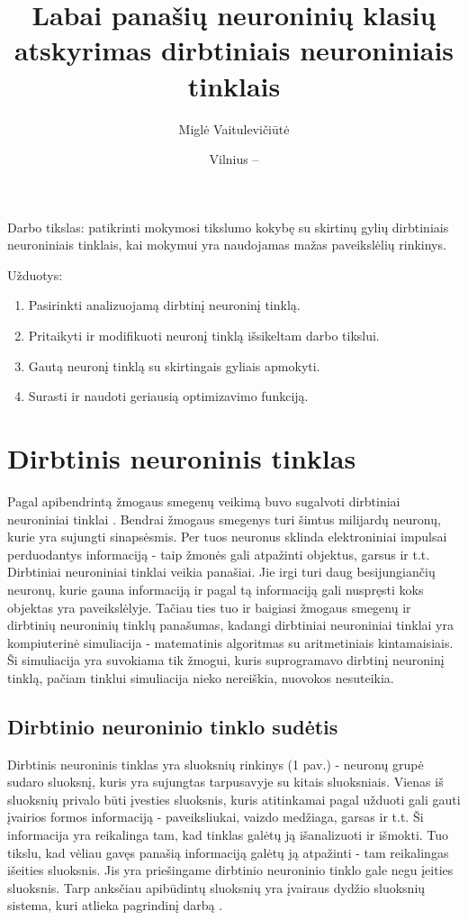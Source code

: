 \documentclass{VUMIFPSkursinis}
\title{Labai panašių neuroninių klasių atskyrimas dirbtiniais neuroniniais tinklais}
\author{Miglė Vaitulevičiūtė}
\date{Vilnius – \the\year}
\begin{document}
	
\maketitle
\cleardoublepage{}
\setcounter{page}{2}

\tableofcontents


Darbo tikslas: patikrinti mokymosi tikslumo kokybę su skirtinų gylių dirbtiniais neuroniniais tinklais, kai mokymui yra naudojamas mažas paveikslėlių rinkinys.

Užduotys:
\begin{enumerate}
\item Pasirinkti analizuojamą dirbtinį neuroninį tinklą.
\item Pritaikyti ir modifikuoti neuronį tinklą išsikeltam darbo tikslui.
\item Gautą neuronį tinklą su skirtingais gyliais apmokyti.
\item Surasti ir naudoti geriausią optimizavimo funkciją.
\end{enumerate}


\section{Dirbtinis neuroninis tinklas}
Pagal apibendrintą žmogaus smegenų veikimą buvo sugalvoti dirbtiniai neuroniniai tinklai \cite{Goodfellow-et-al-2016}. Bendrai žmogaus smegenys turi šimtus
milijardų neuronų, kurie yra sujungti sinapsėsmis. Per tuos neuronus sklinda elektroniniai impulsai perduodantys informaciją - taip žmonės gali 
atpažinti objektus, garsus ir t.t. Dirbtiniai neuroniniai tinklai veikia panašiai. Jie irgi turi daug besijungiančių neuronų, kurie gauna informaciją ir 
pagal tą informaciją gali nuspręsti koks objektas yra paveikslėlyje. Tačiau ties tuo ir baigiasi žmogaus smegenų ir dirbtinių neuroninių tinklų panašumas, 
kadangi dirbtiniai neuroniniai tinklai yra kompiuterinė simuliacija - matematinis algoritmas su aritmetiniais kintamaisiais. Ši simuliacija yra suvokiama 
tik žmogui, kuris suprogramavo dirbtinį neuroninį tinklą, pačiam tinklui simuliacija nieko nereiškia, nuovokos nesuteikia.

\subsection{Dirbtinio neuroninio tinklo sudėtis}
Dirbtinis neuroninis tinklas yra sluoksnių rinkinys (1 pav.) - neuronų grupė sudaro sluoksnį, kuris yra sujungtas tarpusavyje su kitais sluoksniais. Vienas iš
sluoksnių privalo būti įvesties sluoksnis, kuris atitinkamai pagal užduoti gali gauti įvairios formos informaciją - paveiksliukai, vaizdo
medžiaga, garsas ir t.t. Ši informacija yra reikalinga tam, kad tinklas galėtų ją išanalizuoti ir išmokti. Tuo tikslu, kad vėliau gavęs panašią
informaciją galėtų ją atpažinti - tam reikalingas išeities sluoksnis. Jis yra priešingame dirbtinio neuroninio tinklo gale negu įeities sluoksnis.
Tarp anksčiau apibūdintų sluoksnių yra įvairaus dydžio sluoksnių sistema, kuri atlieka pagrindinį darbą \cite{Woodford-2018}.
\end{document}
